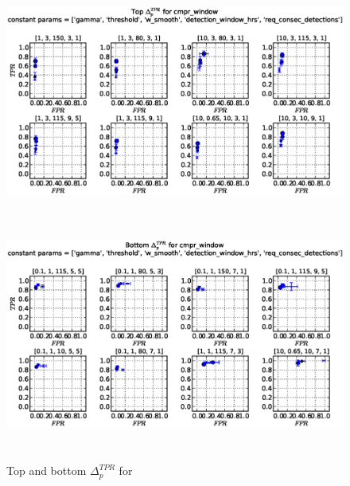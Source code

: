 \begin{figure}[!h]
\begin{center}
\includegraphics[height=3in]{../fig/final/top_tpr/cmpr_window}
\includegraphics[height=3in]{../fig/final/bottom_tpr/cmpr_window}
\end{center}
\caption{\label{fig:delta_top_bottom2t} Top and bottom $\Delta_p^{TPR}$ for }
\end{figure}



